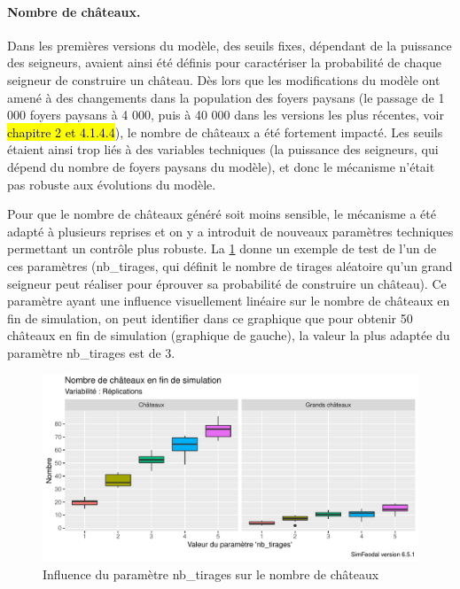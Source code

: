 \paragraph{Nombre de châteaux.}
Dans les premières versions du modèle, des seuils fixes, dépendant de la puissance des seigneurs, avaient ainsi été définis pour caractériser la probabilité de chaque seigneur de construire un château.
Dès lors que les modifications du modèle ont amené à des changements dans la population des foyers paysans (le passage de 1 000 foyers paysans à 4 000, puis à 40 000 dans les versions les plus récentes, voir \hl{chapitre 2 et 4.1.4.4}), le nombre de châteaux a été fortement impacté.
Les seuils étaient ainsi trop liés à des variables techniques (la puissance des seigneurs, qui dépend du nombre de foyers paysans du modèle), et donc le mécanisme n'était pas robuste aux évolutions du modèle.

Pour que le nombre de châteaux généré soit moins sensible, le mécanisme a été adapté à plusieurs reprises et on y a introduit de nouveaux paramètres techniques permettant un contrôle plus robuste.
La \cref{fig:calibrage-param-chateaux} donne un exemple de test de l'un de ces paramètres (\textsf{nb\_tirages}, qui définit le nombre de tirages aléatoire qu'un grand seigneur peut réaliser pour éprouver sa probabilité de construire un château).
Ce paramètre ayant une influence visuellement linéaire sur le nombre de châteaux en fin de simulation, on peut identifier dans ce graphique que pour obtenir 50 châteaux en fin de simulation (graphique de gauche), la valeur la plus adaptée du paramètre \textsf{nb\_tirages} est de 3.

\begin{figure}[H]
	\centering
	\includegraphics[width=\linewidth]{img/calibrage_nombre_chateaux.pdf}
	\caption[Influence du paramètre \textsf{nb\_tirages} sur le nombre de châteaux.]{Influence du paramètre \textsf{nb\_tirages} sur le nombre de châteaux%
	}
	\label{fig:calibrage-param-chateaux}
\end{figure}

